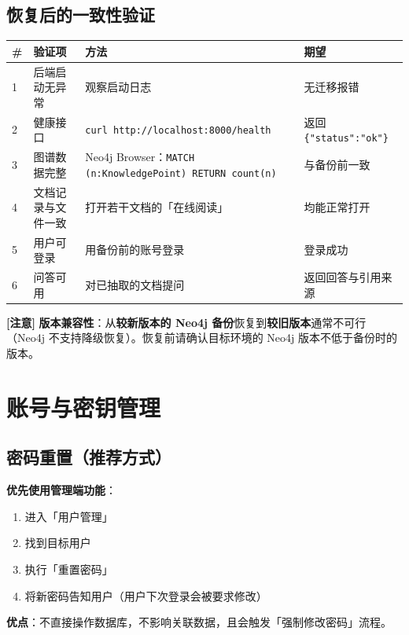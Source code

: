\documentclass[UTF8,a4paper,11pt]{ctexrep}
\newcommand{\warnmark}{\textcolor{todobar}{\textbf{[注意]}}}
\begin{document}
\subsection{恢复后的一致性验证}

\begin{center}
\small
\begin{tabularx}{\linewidth}{@{}XXXX@{}}
\toprule
\# & 验证项 & 方法 & 期望 \\
\midrule
1 & 后端启动无异常 & 观察启动日志 & 无迁移报错 \\
2 & 健康接口 & \texttt{curl http://localhost:8000/health} & 返回 \texttt{\{"status":"ok"\}} \\
3 & 图谱数据完整 & Neo4j Browser：\texttt{MATCH (n:KnowledgePoint) RETURN count(n)} & 与备份前一致 \\
4 & 文档记录与文件一致 & 打开若干文档的「在线阅读」 & 均能正常打开 \\
5 & 用户可登录 & 用备份前的账号登录 & 登录成功 \\
6 & 问答可用 & 对已抽取的文档提问 & 返回回答与引用来源 \\
\bottomrule
\end{tabularx}
\end{center}
\begin{todobox}
\warnmark{} \textbf{版本兼容性}：从\textbf{较新版本的 Neo4j 备份}恢复到\textbf{较旧版本}通常不可行（Neo4j 不支持降级恢复）。恢复前请确认目标环境的 Neo4j 版本不低于备份时的版本。

\end{todobox}


\section{账号与密钥管理}


\subsection{密码重置（推荐方式）}

\textbf{优先使用管理端功能}：

\begin{enumerate}
\item 进入「用户管理」
\item 找到目标用户
\item 执行「重置密码」
\item 将新密码告知用户（用户下次登录会被要求修改）
\end{enumerate}
\textbf{优点}：不直接操作数据库，不影响关联数据，且会触发「强制修改密码」流程。
\end{document}
